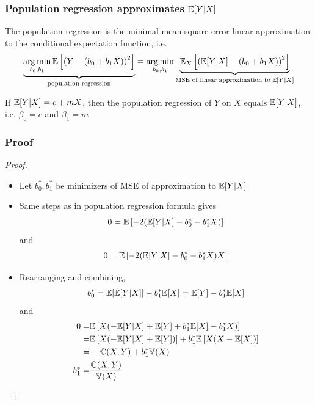 \begin{frame}\frametitle{Population regression approximates
    $\mathbb{E}[Y|X]$}
  \begin{lemma} \label{lem:regapprox}
    The population regression is the minimal mean square error linear
    approximation to the conditional expectation function, i.e.\
    {\footnotesize{
        \begin{align*}
      \underbrace{\argmin_{b_0, b_1} \Er\left[\left(Y-(b_0 + b_1
          X) \right)^2\right]}_{\text{population regression}} =
      \argmin_{b_0, b_1} \underbrace{\Er_X\left[\left(\Er[Y|X] - (b_0 + b_1
          X)\right)^2\right]}_{\text{MSE of linear approximation to $\Er[Y|X]$}}
    \end{align*}
  }}
  \end{lemma}
  
  \begin{corollary} 
    If $\mathbb{E}[Y|X] = c + m X$, then the population regression of $Y$ on
    $X$ equals $\mathbb{E}[Y|X]$, i.e. $\beta_0 = c$ and $\beta_1 = m$
  \end{corollary}
\end{frame}

\begin{frame}[shrink]\frametitle{Proof}
  \begin{proof}
    \begin{itemize}
    \item Let $b^*_0, b^*_1$ be minimizers of MSE of approximation to $\mathbb{E}[Y|X]$
    \item Same steps as in population regression formula gives
      \[ 0 = \mathbb{E}\left[ -2(\mathbb{E}[Y|X] - b^*_0 - b^*_1 X) \right]  \]
      and
      \[ 0 = \mathbb{E}\left[ -2(\mathbb{E}[Y|X] - b^*_0 - b^*_1 X)X \right]  \]
    \item Rearranging and combining,
      \begin{align*}
        b_0^* = \mathbb{E}[\mathbb{E}[Y|X]] - b_1^* \mathbb{E}[X] = \mathbb{E}[Y] - b_1^* \mathbb{E}[X]
      \end{align*}
      and
      \begin{align*}
        0 = & \mathbb{E}\left[ X(-\mathbb{E}[Y|X] + \mathbb{E}[Y] + b^*_1 \mathbb{E}[X] - b^*_1 X) \right] \\
        = & \mathbb{E}\left[X(-\mathbb{E}[Y|X] + \mathbb{E}[Y])\right] + b^*_1\mathbb{E}\left[X(X -
          \mathbb{E}[X])\right] \\
        = & -\mathbb{C}(X,Y) + b^*_1 \mathbb{V}(X) \\
        b^*_1 = & \frac{\mathbb{C}(X,Y)}{\mathbb{V}(X)}      
      \end{align*}
    \end{itemize}
  \end{proof}
\end{frame}


